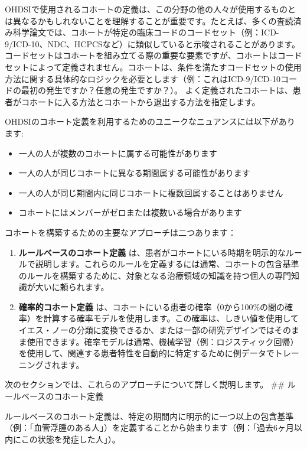 \documentclass[
  11pt]{book}
\providecommand{\tightlist}{%
  \setlength{\itemsep}{0pt}\setlength{\parskip}{0pt}}
\theoremstyle{definition}
\theoremstyle{definition}
\theoremstyle{definition}
\theoremstyle{definition}
\theoremstyle{remark}
\begin{document}
 
OHDSIで使用されるコホートの定義は、この分野の他の人々が使用するものとは異なるかもしれないことを理解することが重要です。たとえば、多くの査読済み科学論文では、コホートが特定の臨床コードのコードセット（例：ICD-9/ICD-10、NDC、HCPCSなど）に類似していると示唆されることがあります。コードセットはコホートを組み立てる際の重要な要素ですが、コホートはコードセットによって定義されません。コホートは、条件を満たすコードセットの使用方法に関する具体的なロジックを必要とします（例：これはICD-9/ICD-10コードの最初の発生ですか？任意の発生ですか？）。 よく定義されたコホートは、患者がコホートに入る方法とコホートから退出する方法を指定します。

OHDSIのコホート定義を利用するためのユニークなニュアンスには以下があります:

\begin{itemize}
\tightlist
\item
  一人の人が複数のコホートに属する可能性があります
\item
  一人の人が同じコホートに異なる期間属する可能性があります
\item
  一人の人が同じ期間内に同じコホートに複数回属することはありません
\item
  コホートにはメンバーがゼロまたは複数いる場合があります
\end{itemize}

コホートを構築するための主要なアプローチは二つあります：

\begin{enumerate}
\def\labelenumi{\arabic{enumi}.}
\tightlist
\item
  \textbf{ルールベースのコホート定義} は、患者がコホートにいる時期を明示的なルールで説明します。これらのルールを定義するには通常、コホートの包含基準のルールを構築するために、対象となる治療領域の知識を持つ個人の専門知識が大いに頼られます。
\item
  \textbf{確率的コホート定義} は、コホートにいる患者の確率（0から100\%の間の確率）を計算する確率モデルを使用します。この確率は、しきい値を使用してイエス・ノーの分類に変換できるか、または一部の研究デザインではそのまま使用できます。確率モデルは通常、機械学習（例：ロジスティック回帰）を使用して、関連する患者特性を自動的に特定するために例データでトレーニングされます。
\end{enumerate}

次のセクションでは、これらのアプローチについて詳しく説明します。
\#\# ルールベースのコホート定義

ルールベースのコホート定義は、特定の期間内に明示的に一つ以上の包含基準（例：「血管浮腫のある人」）を定義することから始まります（例：「過去6ヶ月以内にこの状態を発症した人」）。
\end{document}
